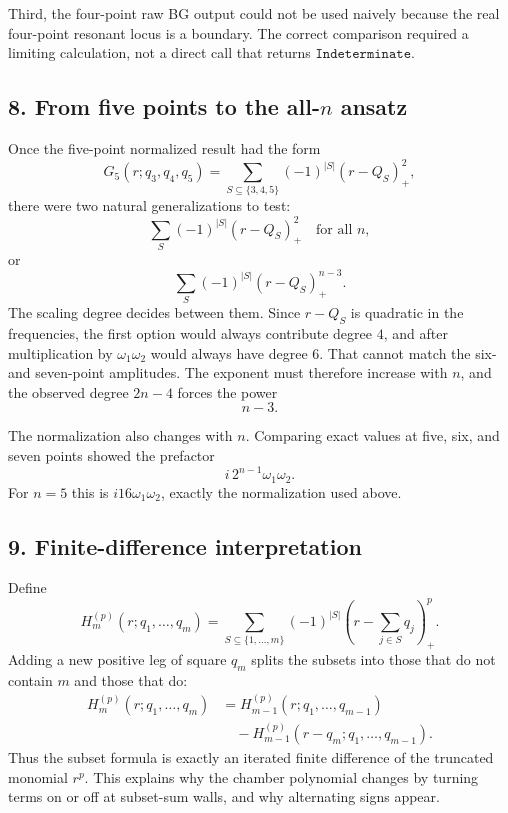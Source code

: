 \documentclass[11pt]{article}
\begin{document}
Third, the four-point raw BG output could not be used naively because the real
four-point resonant locus is a boundary. The correct comparison required a
limiting calculation, not a direct call that returns \(\texttt{Indeterminate}\).

\subsection*{8. From five points to the all-\(n\) ansatz}

Once the five-point normalized result had the form
\[
    G_5(r;q_3,q_4,q_5)
    =
    \sum_{S\subseteq\{3,4,5\}}
       (-1)^{|S|}(r-Q_S)_+^2,
\]
there were two natural generalizations to test:
\[
    \sum_S(-1)^{|S|}(r-Q_S)_+^2
    \quad\text{for all }n,
\]
or
\[
    \sum_S(-1)^{|S|}(r-Q_S)_+^{n-3}.
\]
The scaling degree decides between them. Since \(r-Q_S\) is quadratic in the
frequencies, the first option would always contribute degree \(4\), and after
multiplication by \(\omega_1\omega_2\) would always have degree \(6\). That
cannot match the six- and seven-point amplitudes. The exponent must therefore
increase with \(n\), and the observed degree \(2n-4\) forces the power
\[
    n-3.
\]

The normalization also changes with \(n\). Comparing exact values at five, six,
and seven points showed the prefactor
\[
    i\,2^{n-1}\omega_1\omega_2.
\]
For \(n=5\) this is \(i16\omega_1\omega_2\), exactly the normalization used
above.

\subsection*{9. Finite-difference interpretation}

Define
\[
    H_m^{(p)}(r;q_1,\ldots,q_m)
    =
    \sum_{S\subseteq\{1,\ldots,m\}}
       (-1)^{|S|}\left(r-\sum_{j\in S}q_j\right)_+^p.
\]
Adding a new positive leg of square \(q_m\) splits the subsets into those that
do not contain \(m\) and those that do:
\[
\begin{aligned}
H_m^{(p)}(r;q_1,\ldots,q_m)
&=
H_{m-1}^{(p)}(r;q_1,\ldots,q_{m-1})\\
&\quad -
H_{m-1}^{(p)}(r-q_m;q_1,\ldots,q_{m-1}).
\end{aligned}
\]
Thus the subset formula is exactly an iterated finite difference of the
truncated monomial \(r^p\). This explains why the chamber polynomial changes by
turning terms on or off at subset-sum walls, and why alternating signs appear.
\end{document}
